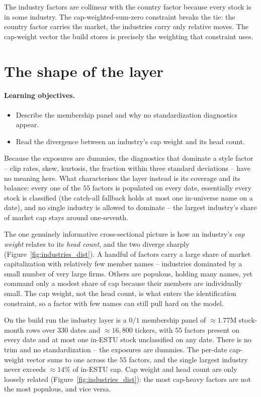 \documentclass[11pt]{article}
\theoremstyle{definition}
\theoremstyle{plain}
\theoremstyle{remark}
\begin{document}
\begin{keyresult}
The industry factors are collinear with the country factor because every stock is in some industry. The cap-weighted-sum-zero constraint breaks the tie: the country factor carries the market, the industries carry only relative moves. The cap-weight vector the build stores is precisely the weighting that constraint uses.
\end{keyresult}

\section{The shape of the layer}\label{sec:shape}

\paragraph{Learning objectives.}
\begin{itemize}[leftmargin=1.4em,topsep=2pt]
  \item Describe the membership panel and why no standardization diagnostics appear.
  \item Read the divergence between an industry's cap weight and its head count.
\end{itemize}

Because the exposures are dummies, the diagnostics that dominate a style factor -- clip rates, skew, kurtosis, the fraction within three standard deviations -- have no meaning here. What characterises the layer instead is its coverage and its balance: every one of the $55$ factors is populated on every date, essentially every stock is classified (the catch-all fallback holds at most one in-universe name on a date), and no single industry is allowed to dominate -- the largest industry's share of market cap stays around one-seventh.

The one genuinely informative cross-sectional picture is how an industry's \emph{cap weight} relates to its \emph{head count}, and the two diverge sharply (Figure~\ref{fig:industries_dist}). A handful of factors carry a large share of market capitalization with relatively few member names -- industries dominated by a small number of very large firms. Others are populous, holding many names, yet command only a modest share of cap because their members are individually small. The cap weight, not the head count, is what enters the identification constraint, so a factor with few names can still pull hard on the model.

\begin{observed}
On the build run the industry layer is a $0/1$ membership panel of $\approx 1.77$M stock-month rows over $330$ dates and $\approx 16{,}800$ tickers, with $55$ factors present on every date and at most one in-ESTU stock unclassified on any date. There is no trim and no standardization -- the exposures are dummies. The per-date cap-weight vector sums to one across the $55$ factors, and the single largest industry never exceeds $\approx 14\%$ of in-ESTU cap. Cap weight and head count are only loosely related (Figure~\ref{fig:industries_dist}): the most cap-heavy factors are not the most populous, and vice versa.
\end{observed}
\end{document}
